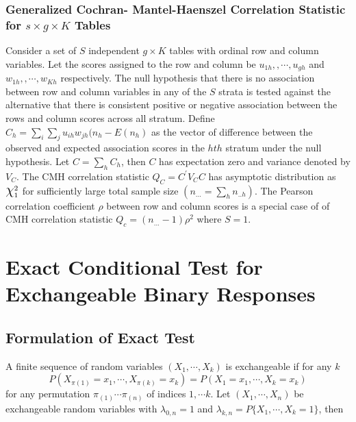 \documentclass[12pt,oneside]{report}
\theoremstyle{definition}
\theoremstyle{mystyle}
\begin{document}
\subsection{Generalized Cochran- Mantel-Haenszel Correlation Statistic for $s\times g\times K$ Tables}
Consider a set of $S$ independent $g\times K$ tables with ordinal row and column variables. Let the scores assigned to the row and column be $u_{1h},,\cdots,u_{gh}$ and $w_{1h},,\cdots,w_{Kh}$ respectively. The null hypothesis that there is no association between row and column variables in any of the $S$ strata is tested against the alternative that there is consistent positive or negative association between the rows and column scores across all stratum. Define  $C_{h}=\sum\limits_{i}^{}\sum\limits_{j}^{}u_{ih}w_{jh}(n_{h}-E(n_{h}) $ as the vector of difference between the observed and expected association scores in the $hth$ stratum under the null hypothesis. Let $C=\sum\limits_{h}C_{h}$, then $C$ has expectation zero and variance denoted by $V_{C}$. The CMH correlation statistic $Q_{C}=C^{\prime}V_{C}C$ has asymptotic distribution as $\mbox{\Large$\chi$}_{1}^{2}$ for sufficiently large total sample size $(n_{...}=\sum\limits_{h}n_{..h})$. The Pearson correlation coefficient $\rho$ between row and column scores is a special case of of CMH correlation statistic $Q_{c}=(n_{...}-1)\rho^{2}$ where $S=1$.





\chapter{Exact Conditional Test for Exchangeable Binary Responses}
\section{Formulation of Exact Test}
A finite sequence of random variables $(X_{1},\cdots,X_{k})$ is exchangeable if  for any $k$
\begin{equation*}
P(X_{\pi(1)}=x_{1},\cdots,X_{\pi(k)}=x_{k})=P(X_{1}=x_{1},\cdots,X_{k}=x_{k})
\end{equation*}
for any permutation $\pi_{(1)}\cdots\pi_{(n)}$ of indices $1,\cdots k$. 
Let $(X_{1},\cdots,X_n)$ be  exchangeable random variables with $\lambda_{0,n}=1$ and $\lambda_{k,n}=P\{X_{1},\cdots,X_{k}=1\}$, then\\
\end{document}
